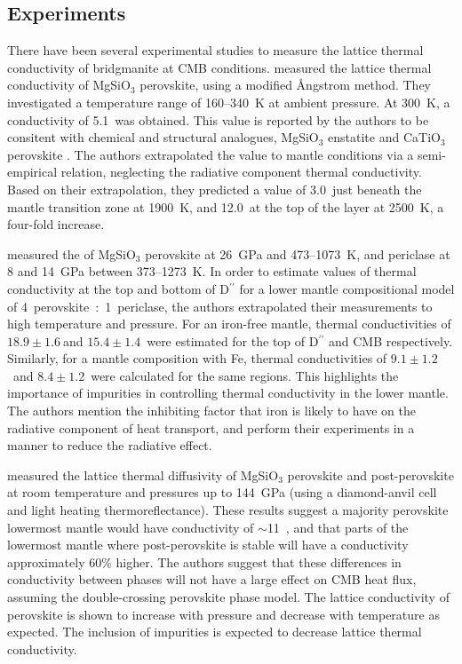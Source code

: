 \subsection{Experiments}

There have been several experimental studies to measure the lattice thermal conductivity of bridgmanite at CMB conditions. \citet{Osako1991} measured the lattice thermal conductivity of MgSiO$_3$ perovskite, using a modified \AA ngstrom method. They investigated a temperature range of 160--340~K at ambient pressure. At 300~K, a conductivity of 5.1~\wmks was obtained. This value is reported by the authors to be consitent with chemical and structural analogues, MgSiO$_3$ enstatite \citep[5.0~\wmk,][]{Horai1971} and CaTiO$_{3}$ perovskite \citep[4~\wmk,][]{Touloukian1970}. The authors extrapolated the value to mantle conditions via a semi-empirical relation, neglecting the radiative component thermal conductivity. Based on their extrapolation, they predicted a value of 3.0~\wmks just beneath the mantle transition zone at 1900~K, and 12.0~\wmks at the top of the \ddds layer at 2500~K, a four-fold increase. 

\citet{Manthilake2011} measured the \tcs of MgSiO$_3$ perovskite at 26~GPa and 473--1073~K, and periclase at 8 and 14~GPa between 373--1273~K. In order to estimate values of thermal conductivity at the top and bottom of D$^{\prime \prime}$ for a lower mantle compositional model of 4~perovskite~:~1~periclase, the authors extrapolated their measurements to high temperature and pressure. For an iron-free mantle, thermal conductivities of $18.9\pm1.6~$\wmks and $15.4\pm1.4$~\wmks were estimated for the top of D$^{\prime \prime}$ and CMB respectively. Similarly, for a mantle composition with Fe, thermal conductivities of $9.1\pm1.2$~\wmks and $8.4\pm1.2$~\wmks were calculated for the same regions. This highlights the importance of impurities in controlling thermal conductivity in the lower mantle. The authors mention the inhibiting factor that iron is likely to have on the radiative component of heat transport, and perform their experiments in a manner to reduce the radiative effect.

\citet{Ohta2012} measured the lattice thermal diffusivity of MgSiO$_3$ perovskite and post-perovskite at room temperature and pressures up to 144~GPa (using a diamond-anvil cell and light heating thermoreflectance). These results suggest a majority perovskite lowermost mantle would have conductivity of $\sim$11~\wmk, and that parts of the lowermost mantle where post-perovskite is stable will have a conductivity approximately 60\% higher. The authors suggest that these differences in conductivity between phases will not have a large effect on CMB heat flux, assuming the double-crossing perovskite phase model. The lattice conductivity of \mgsios perovskite is shown to increase with pressure and decrease with temperature as expected. The inclusion of impurities is expected to decrease lattice thermal conductivity.

